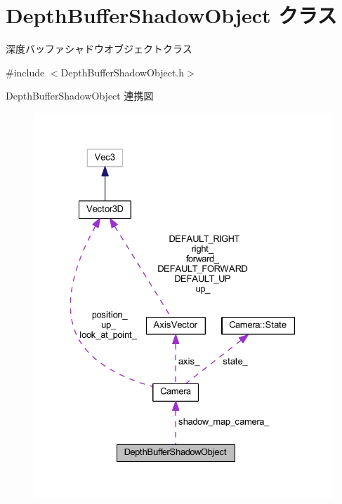 \hypertarget{class_depth_buffer_shadow_object}{}\section{Depth\+Buffer\+Shadow\+Object クラス}
\label{class_depth_buffer_shadow_object}


深度バッファシャドウオブジェクトクラス  




{\ttfamily \#include $<$Depth\+Buffer\+Shadow\+Object.\+h$>$}



Depth\+Buffer\+Shadow\+Object 連携図\nopagebreak
\begin{figure}[H]
\begin{center}
\leavevmode
\includegraphics[width=328pt]{class_depth_buffer_shadow_object__coll__graph}
\end{center}
\end{figure}

